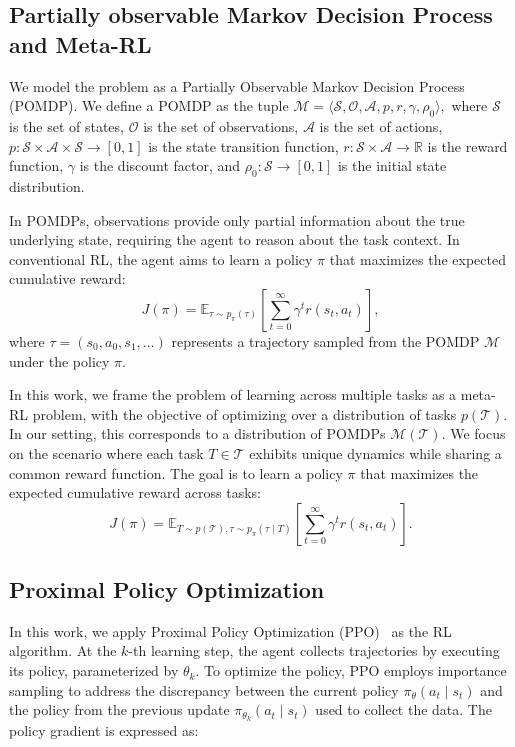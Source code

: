 \subsection{Partially observable Markov Decision Process and Meta-RL}
We model the problem as a Partially Observable Markov Decision Process (POMDP).
We define a POMDP as the tuple 
\(
\mathcal{M} = \langle \mathcal{S}, \mathcal{O}, \mathcal{A}, p, r, \gamma, \rho_0 \rangle,
\)
where \( \mathcal{S} \) is the set of states, \( \mathcal{O} \) is the set of observations, \( \mathcal{A} \) is the set of actions, 
\( p : \mathcal{S} \times \mathcal{A} \times \mathcal{S} \to [0, 1] \) is the state transition function, 
\( r : \mathcal{S} \times \mathcal{A} \to \mathbb{R} \) is the reward function, 
\( \gamma \) is the discount factor, and 
\( \rho_0 : \mathcal{S} \to [0, 1] \) is the initial state distribution.

In POMDPs, observations provide only partial information about the true underlying state, requiring the agent to reason about the task context.
In conventional RL, the agent aims to learn a policy \( \pi \) that maximizes the expected cumulative reward:
\[
J(\pi) = \mathbb{E}_{\tau \sim p_\pi(\tau)} \left[ \sum_{t=0}^\infty \gamma^t r(s_t, a_t) \right],
\]
where \( \tau = (s_0, a_0, s_1, \dots) \) represents a trajectory sampled from the POMDP \( \mathcal{M} \) under the policy \( \pi \).

In this work, we frame the problem of learning across multiple tasks as a meta-RL problem, with the objective of optimizing over a distribution of tasks \( p(\mathcal{T}) \).
In our setting, this corresponds to a distribution of POMDPs \( \mathcal{M}(\mathcal{T}) \). 
We focus on the scenario where each task \( T \in \mathcal{T} \) exhibits unique dynamics while sharing a common reward function.
The goal is to learn a policy \( \pi \) that maximizes the expected cumulative reward across tasks: 
\[
J(\pi) = \mathbb{E}_{T \sim p(\mathcal{T}), \tau \sim p_\pi(\tau \mid T)} \left[ \sum_{t=0}^\infty \gamma^t r(s_t, a_t) \right].
\]

\subsection{Proximal Policy Optimization}
In this work, we apply Proximal Policy Optimization (PPO)~\citep{schulman2017PPO} as the RL algorithm.
At the \( k \)-th learning step, the agent collects trajectories by executing its policy, parameterized by \( \theta_k \).
To optimize the policy, PPO employs importance sampling to address the discrepancy between the current policy  \( \pi_\theta(a_t \mid s_t) \) and the policy from the previous update \( \pi_{\theta_k}(a_t \mid s_t) \) used to collect the data. 
The policy gradient is expressed as:

